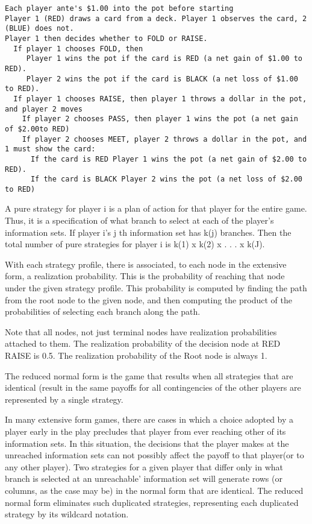 \begin{helpglossary}
\label{pokergloss}
\begin{verbatim} 
Each player ante's $1.00 into the pot before starting
Player 1 (RED) draws a card from a deck. Player 1 observes the card, 2 (BLUE) does not. 
Player 1 then decides whether to FOLD or RAISE. 
  If player 1 chooses FOLD, then 
     Player 1 wins the pot if the card is RED (a net gain of $1.00 to RED).
     Player 2 wins the pot if the card is BLACK (a net loss of $1.00 to RED).
  If player 1 chooses RAISE, then player 1 throws a dollar in the pot, and player 2 moves
    If player 2 chooses PASS, then player 1 wins the pot (a net gain of $2.00to RED)
    If player 2 chooses MEET, player 2 throws a dollar in the pot, and 1 must show the card: 
      If the card is RED Player 1 wins the pot (a net gain of $2.00 to RED).
      If the card is BLACK Player 2 wins the pot (a net loss of $2.00 to RED)
\end{verbatim}

\label{purestratgloss} 
A pure strategy for player i is a plan of action for that player for the 
entire game.  Thus, it is a specification of what branch to select at each 
of the player's information sets.  If player i's j th information set has 
k(j) branches.  Then the total number of pure strategies for player i is 
k(1) x k(2) x . . . x k(J).

\label{realprobgloss}
With each strategy profile, there is associated, to each node in the 
extensive form, a realization probability.  This is the probability of
 reaching that node under the given strategy profile.  This probability is 
computed by finding the path from the root node to the given node, and then 
computing the product of the probabilities of selecting each branch along 
the path.  

Note that all nodes, not just terminal nodes have realization probabilities
 attached to them.  The realization probability of the decision node at RED 
RAISE is 0.5.  The realization probability of the Root node is always 1.

\label{rednormgloss}
The reduced normal form is the game that results when all strategies that 
are identical (result in  the same payoffs for all contingencies of the 
other players are represented by a single strategy.  

In many extensive form games, there are cases in which a choice adopted by 
a player early in the play precludes that player from ever reaching other 
of its information sets.  In this situation, the decisions that the player 
makes at the unreached information sets can not possibly affect the  payoff
 to that player(or to any other player).  Two strategies for a given player
 that differ only in what branch is selected at an unreachable'  information
 set will generate rows (or columns, as the case may be) in the normal form 
that are identical.  The reduced normal form eliminates such duplicated 
strategies, representing each duplicated strategy by its wildcard notation.  


\end{helpglossary}
